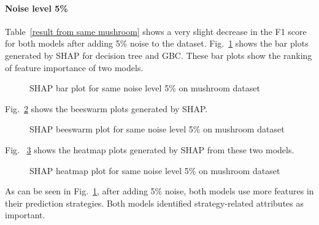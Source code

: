 \documentclass[runningheads,a4paper]{llncs}
\begin{document}
\paragraph{Noise level 5\%}
Table~\ref{result from same mushroom} shows a very slight decrease in the F1 score for both models after adding 5\% noise to the dataset.
Fig.~\ref{bar plots noise level 5} shows the bar plots generated by SHAP for decision tree and GBC. These bar plots show the ranking of feature importance of two models.
\begin{figure}[H]
	\centering
	
	\hfill
	
	
	\caption{SHAP bar plot for same noise level 5\% on mushroom dataset}
	\label{bar plots noise level 5}
\end{figure}

Fig.~\ref{bee plots noise level 5} shows the beeswarm plots generated by SHAP.
\begin{figure}[H]
	\centering
	
	\hfill
	
	
	\caption{SHAP beeswarm plot for same noise level 5\% on mushroom dataset}
	\label{bee plots noise level 5}
	
\end{figure}
Fig. ~\ref{heat plots noise level 5} shows the heatmap plots generated by SHAP from these two models.
\begin{figure}[H]
	\centering
	
	\hfill
	
	
	\caption{SHAP heatmap plot for same noise level 5\% on mushroom dataset}
	\label{heat plots noise level 5}
	
\end{figure}

As can be seen in Fig.~\ref{bar plots noise level 5}, after adding 5\% noise, both models use more features in their prediction strategies. Both models identified strategy-related attributes as important.
\end{document}
